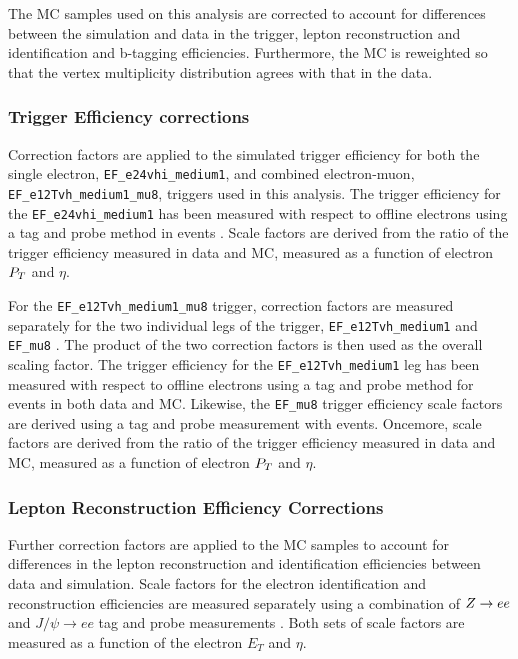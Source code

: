 The MC samples used on this analysis are corrected to account for differences
between the simulation and data in the trigger, lepton reconstruction and
identification and b-tagging efficiencies. Furthermore, the MC is
reweighted so that the vertex multiplicity distribution agrees with
that in the data.

\subsubsection{Trigger Efficiency corrections}
\label{sec:presel:TriggerCorr}

Correction factors are applied to the simulated trigger efficiency for
both the single electron, \linebreak \verb=EF_e24vhi_medium1=, and combined
electron-muon, \verb=EF_e12Tvh_medium1_mu8=, triggers used in this
analysis. The trigger efficiency for the \verb=EF_e24vhi_medium1= has
been measured with respect to offline electrons using a tag and probe
method in \Zee events \cite{TWIKI_EgammaWG_Eff_SF}. Scale factors are derived from the ratio of the
trigger efficiency measured in data and MC, measured as a
function of electron $P_{T}$ and $\eta$.

For the \verb=EF_e12Tvh_medium1_mu8= trigger, correction factors are
measured separately for the two individual legs of the trigger,
\verb=EF_e12Tvh_medium1= and \verb=EF_mu8= \cite{TriggerEfficiency}. The product of the two
correction factors is then used as the overall scaling factor. The
trigger efficiency for the \verb=EF_e12Tvh_medium1= leg has been
measured with respect to offline electrons using a tag and probe
method for \Zee events in both data and MC. Likewise, the
\verb=EF_mu8= trigger efficiency scale factors are derived using a tag
and probe measurement with \Zmumu events. Oncemore, scale factors are derived
from the ratio of the trigger efficiency measured in data and MC, measured as a
function of electron $P_{T}$  and $\eta$.

\subsubsection{Lepton Reconstruction Efficiency Corrections}
\label{sec:presel:LepEffCorr}

Further correction factors are applied to the MC samples to account
for differences in the lepton reconstruction and identification
efficiencies between data and simulation. Scale factors for the electron
identification and reconstruction efficiencies are measured separately
using a combination of $Z\rightarrow ee$ and $J/\psi \rightarrow ee$ tag and probe
measurements \cite{EGammaRecomendations}. 
Both sets of scale factors are measured as a function of the electron $E_T$ and $\eta$. 

